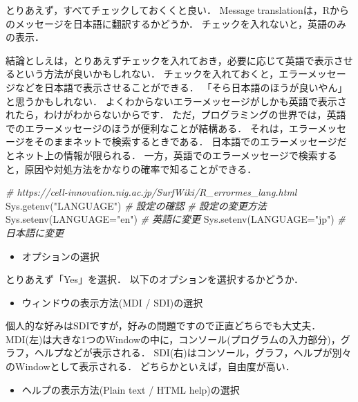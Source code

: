 \documentclass[
]{article}
\newenvironment{Shaded}{\begin{snugshade}}{\end{snugshade}}
\newcommand{\AttributeTok}[1]{\textcolor[rgb]{0.77,0.63,0.00}{#1}}
\newcommand{\CommentTok}[1]{\textcolor[rgb]{0.56,0.35,0.01}{\textit{#1}}}
\newcommand{\FunctionTok}[1]{\textcolor[rgb]{0.00,0.00,0.00}{#1}}
\newcommand{\NormalTok}[1]{#1}
\newcommand{\StringTok}[1]{\textcolor[rgb]{0.31,0.60,0.02}{#1}}
\providecommand{\tightlist}{%
  \setlength{\itemsep}{0pt}\setlength{\parskip}{0pt}}
\begin{document}
とりあえず，すべてチェックしておくくと良い．
Message translationは，Rからのメッセージを日本語に翻訳するかどうか．
チェックを入れないと，英語のみの表示．

結論としえは，とりあえずチェックを入れておき，必要に応じて英語で表示させるという方法が良いかもしれない．
チェックを入れておくと，エラーメッセージなどを日本語で表示させることができる．
「そら日本語のほうが良いやん」と思うかもしれない．
よくわからないエラーメッセージがしかも英語で表示されたら，わけがわからないからです．
ただ，プログラミングの世界では，英語でのエラーメッセージのほうが便利なことが結構ある．
それは，エラーメッセージをそのままネットで検索するときである．
日本語でのエラーメッセージだとネット上の情報が限られる．
一方，英語でのエラーメッセージで検索すると，原因や対処方法をかなりの確率で知ることができる．

\begin{Shaded}
\begin{Highlighting}[]
  \CommentTok{\# https://cell{-}innovation.nig.ac.jp/SurfWiki/R\_errormes\_lang.html}
  \FunctionTok{Sys.getenv}\NormalTok{(}\StringTok{"LANGUAGE"}\NormalTok{) }\CommentTok{\# 設定の確認}
  \CommentTok{\# 設定の変更方法}
  \FunctionTok{Sys.setenv}\NormalTok{(}\AttributeTok{LANGUAGE=}\StringTok{"en"}\NormalTok{) }\CommentTok{\# 英語に変更}
  \FunctionTok{Sys.setenv}\NormalTok{(}\AttributeTok{LANGUAGE=}\StringTok{"jp"}\NormalTok{) }\CommentTok{\# 日本語に変更}
\end{Highlighting}
\end{Shaded}

\begin{itemize}
\tightlist
\item
  オプションの選択
\end{itemize}

とりあえず「Yes」を選択．
以下のオプションを選択するかどうか．

\begin{itemize}
\tightlist
\item
  ウィンドウの表示方法(MDI / SDI)の選択
\end{itemize}

個人的な好みはSDIですが，好みの問題ですので正直どちらでも大丈夫．
MDI(左)は大きな1つのWindowの中に，コンソール(プログラムの入力部分)，グラフ，ヘルプなどが表示される．
SDI(右)はコンソール，グラフ，ヘルプが別々のWindowとして表示される．
どちらかといえば，自由度が高い．

\begin{itemize}
\tightlist
\item
  ヘルプの表示方法(Plain text / HTML help)の選択
\end{itemize}
\end{document}
